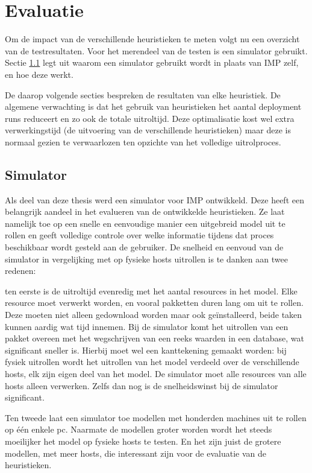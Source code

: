 
\chapter{Evaluatie}
\label{sec:evaluatie}
Om de impact van de verschillende heuristieken te meten volgt nu een overzicht van de testresultaten.
Voor het merendeel van de testen is een simulator gebruikt.
Sectie \ref{sec:simulator} legt uit waarom een simulator gebruikt wordt in plaats van IMP zelf, en hoe deze werkt.

De daarop volgende secties bespreken de resultaten van elke heuristiek. 
De algemene verwachting is dat het gebruik van heuristieken het aantal deployment runs reduceert en zo ook de totale uitroltijd.
Deze optimalisatie kost wel extra verwerkingstijd (de uitvoering van de verschillende heuristieken) maar deze is normaal gezien te verwaarlozen ten opzichte van het volledige uitrolproces. 

\section{Simulator}
\label{sec:simulator}
Als deel van deze thesis werd een simulator voor IMP ontwikkeld.
Deze heeft een belangrijk aandeel in het evalueren van de ontwikkelde heuristieken.
Ze laat namelijk toe op een snelle en eenvoudige manier een uitgebreid model uit te rollen en geeft volledige controle over welke informatie tijdens dat proces beschikbaar wordt gesteld aan de gebruiker.
De snelheid en eenvoud van de simulator in vergelijking met op fysieke hosts uitrollen is te danken aan twee redenen:

ten eerste is de uitroltijd evenredig met het aantal resources in het model.
Elke resource moet verwerkt worden, en vooral pakketten duren lang om uit te rollen. 
Deze moeten niet alleen gedownload worden maar ook ge\"installeerd, beide taken kunnen aardig wat tijd innemen.
Bij de simulator komt het uitrollen van een pakket overeen met het wegschrijven van een reeks waarden in een database, wat significant sneller is.
Hierbij moet wel een kanttekening gemaakt worden: bij fysiek uitrollen wordt het uitrollen van het model verdeeld over de verschillende hosts, elk zijn eigen deel van het model.
De simulator moet alle resources van alle hosts alleen verwerken. 
Zelfs dan nog is de snelheidswinst bij de simulator significant.

Ten tweede laat een simulator toe modellen met honderden machines uit te rollen op \'e\'en enkele pc.
Naarmate de modellen groter worden wordt het steeds moeilijker het model op fysieke hosts te testen.
En het zijn juist de grotere modellen, met meer hosts, die interessant zijn voor de evaluatie van de heuristieken.

